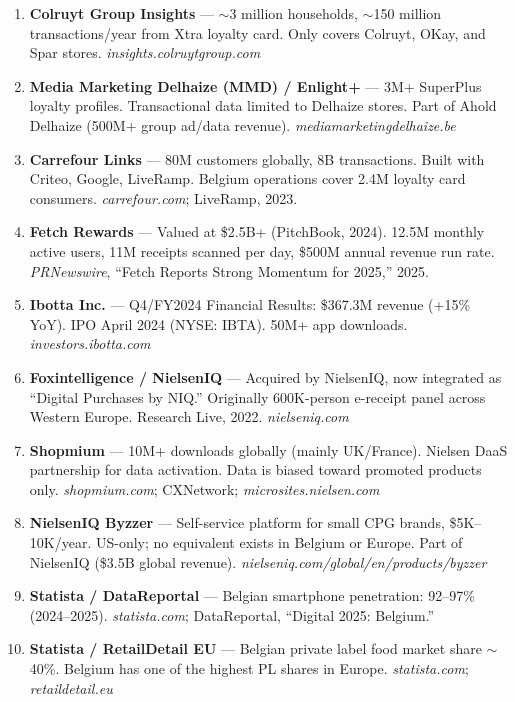 \documentclass[11pt,a4paper]{article}
\begin{document}
\begin{enumerate}[leftmargin=1.5em, itemsep=2pt, font=\small]
  \item[\textbf{[7]}] \textbf{Colruyt Group Insights} --- $\sim$3 million households, $\sim$150 million transactions/year from Xtra loyalty card. Only covers Colruyt, OKay, and Spar stores. \textit{insights.colruytgroup.com}
  \item[\textbf{[8]}] \textbf{Media Marketing Delhaize (MMD) / Enlight+} --- 3M+ SuperPlus loyalty profiles. Transactional data limited to Delhaize stores. Part of Ahold Delhaize (\texteuro{}500M+ group ad/data revenue). \textit{mediamarketingdelhaize.be}
  \item[\textbf{[9]}] \textbf{Carrefour Links} --- 80M customers globally, 8B transactions. Built with Criteo, Google, LiveRamp. Belgium operations cover 2.4M loyalty card consumers. \textit{carrefour.com}; LiveRamp, 2023.
  \item[\textbf{[10]}] \textbf{Fetch Rewards} --- Valued at \$2.5B+ (PitchBook, 2024). 12.5M monthly active users, 11M receipts scanned per day, \$500M annual revenue run rate. \textit{PRNewswire}, ``Fetch Reports Strong Momentum for 2025,'' 2025.
  \item[\textbf{[11]}] \textbf{Ibotta Inc.} --- Q4/FY2024 Financial Results: \$367.3M revenue (+15\% YoY). IPO April 2024 (NYSE: IBTA). 50M+ app downloads. \textit{investors.ibotta.com}
  \item[\textbf{[12]}] \textbf{Foxintelligence / NielsenIQ} --- Acquired by NielsenIQ, now integrated as ``Digital Purchases by NIQ.'' Originally 600K-person e-receipt panel across Western Europe. Research Live, 2022. \textit{nielseniq.com}
  \item[\textbf{[13]}] \textbf{Shopmium} --- 10M+ downloads globally (mainly UK/France). Nielsen DaaS partnership for data activation. Data is biased toward promoted products only. \textit{shopmium.com}; CXNetwork; \textit{microsites.nielsen.com}
  \item[\textbf{[14]}] \textbf{NielsenIQ Byzzer} --- Self-service platform for small CPG brands, \$5K--10K/year. US-only; no equivalent exists in Belgium or Europe. Part of NielsenIQ (\$3.5B global revenue). \textit{nielseniq.com/global/en/products/byzzer}
  \item[\textbf{[15]}] \textbf{Statista / DataReportal} --- Belgian smartphone penetration: 92--97\% (2024--2025). \textit{statista.com}; DataReportal, ``Digital 2025: Belgium.''
  \item[\textbf{[16]}] \textbf{Statista / RetailDetail EU} --- Belgian private label food market share $\sim$40\%. Belgium has one of the highest PL shares in Europe. \textit{statista.com}; \textit{retaildetail.eu}

\end{enumerate}
\end{document}
